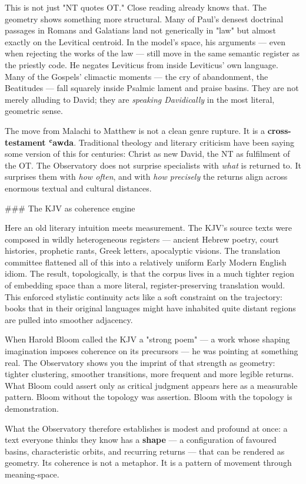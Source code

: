 \documentclass[12pt,a4paper]{article}
\begin{document}
This is not just "NT quotes OT." Close reading already knows that. The geometry shows something more structural. Many of Paul's densest doctrinal passages in Romans and Galatians land not generically in "law" but almost exactly on the Levitical centroid. In the model's space, his arguments --- even when rejecting the works of the law --- still move in the same semantic register as the priestly code. He negates Leviticus from inside Leviticus' own language. Many of the Gospels' climactic moments --- the cry of abandonment, the Beatitudes --- fall squarely inside Psalmic lament and praise basins. They are not merely alluding to David; they are \textit{speaking Davidically} in the most literal, geometric sense.

The move from Malachi to Matthew is not a clean genre rupture. It is a \textbf{cross-testament ʿawda}. Traditional theology and literary criticism have been saying some version of this for centuries: Christ as new David, the NT as fulfilment of the OT. The Observatory does not surprise specialists with \textit{what} is returned to. It surprises them with \textit{how often}, and with \textit{how precisely} the returns align across enormous textual and cultural distances.

\#\#\# The KJV as coherence engine

Here an old literary intuition meets measurement. The KJV's source texts were composed in wildly heterogeneous registers --- ancient Hebrew poetry, court histories, prophetic rants, Greek letters, apocalyptic visions. The translation committee flattened all of this into a relatively uniform Early Modern English idiom. The result, topologically, is that the corpus lives in a much tighter region of embedding space than a more literal, register-preserving translation would. This enforced stylistic continuity acts like a soft constraint on the trajectory: books that in their original languages might have inhabited quite distant regions are pulled into smoother adjacency.

When Harold Bloom called the KJV a "strong poem" --- a work whose shaping imagination imposes coherence on its precursors --- he was pointing at something real. The Observatory shows you the imprint of that strength as geometry: tighter clustering, smoother transitions, more frequent and more legible returns. What Bloom could assert only as critical judgment appears here as a measurable pattern. Bloom without the topology was assertion. Bloom with the topology is demonstration.

What the Observatory therefore establishes is modest and profound at once: a text everyone thinks they know has a \textbf{shape} --- a configuration of favoured basins, characteristic orbits, and recurring returns --- that can be rendered as geometry. Its coherence is not a metaphor. It is a pattern of movement through meaning-space.
\end{document}
